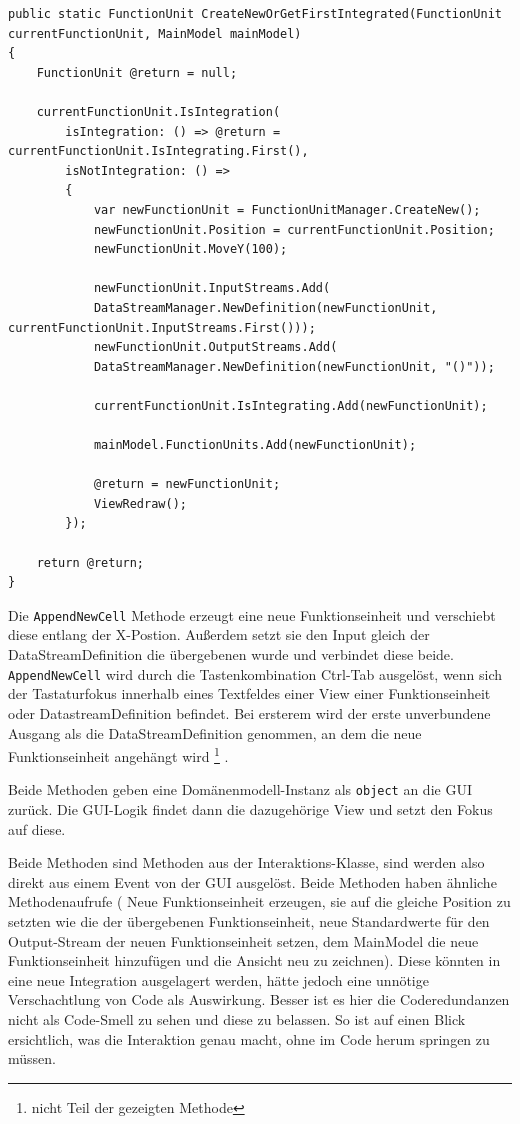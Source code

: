 \begin{lstlisting}[caption=CreateNewOrGetFirstIntegrated]
public static FunctionUnit CreateNewOrGetFirstIntegrated(FunctionUnit currentFunctionUnit, MainModel mainModel)
{
	FunctionUnit @return = null;
	
	currentFunctionUnit.IsIntegration(
		isIntegration: () => @return = 		currentFunctionUnit.IsIntegrating.First(),
		isNotIntegration: () =>
		{
			var newFunctionUnit = FunctionUnitManager.CreateNew();
			newFunctionUnit.Position = currentFunctionUnit.Position;
			newFunctionUnit.MoveY(100);
			
			newFunctionUnit.InputStreams.Add(
			DataStreamManager.NewDefinition(newFunctionUnit, currentFunctionUnit.InputStreams.First()));
			newFunctionUnit.OutputStreams.Add(
			DataStreamManager.NewDefinition(newFunctionUnit, "()"));
			
			currentFunctionUnit.IsIntegrating.Add(newFunctionUnit);
			
			mainModel.FunctionUnits.Add(newFunctionUnit);
			
			@return = newFunctionUnit;
			ViewRedraw();
		});
	
	return @return;
}
	\end{lstlisting}





	Die \texttt{AppendNewCell} Methode erzeugt eine neue Funktionseinheit und 
	verschiebt diese entlang der X-Postion.
	Außerdem setzt sie den Input gleich der DataStreamDefinition die
	übergebenen wurde und verbindet diese beide.
	\texttt{AppendNewCell} wird durch die Tastenkombination Ctrl-Tab ausgelöst, wenn
	sich der Tastaturfokus innerhalb eines Textfeldes einer View einer Funktionseinheit oder
	DatastreamDefinition befindet. Bei ersterem wird der erste unverbundene
  Ausgang als die	DataStreamDefinition genommen, an dem die neue Funktionseinheit angehängt wird \footnote{nicht Teil der gezeigten Methode} .
	
	Beide Methoden geben eine
	Domänenmodell-Instanz als \texttt{object} an die GUI zurück. Die GUI-Logik findet dann die
	dazugehörige View und setzt den Fokus auf diese.
	
	Beide Methoden sind Methoden aus der Interaktions-Klasse, sind werden also
	direkt aus einem Event von der GUI ausgelöst. 
	Beide Methoden haben ähnliche Methodenaufrufe ( Neue Funktionseinheit
	erzeugen, sie auf die gleiche Position zu setzten wie die der übergebenen
	Funktionseinheit, neue Standardwerte für den Output-Stream der neuen
	Funktionseinheit setzen, dem MainModel die neue Funktionseinheit hinzufügen
  und die Ansicht neu zu zeichnen).
  Diese könnten in eine neue Integration ausgelagert werden, hätte jedoch eine unnötige
	Verschachtlung von Code als Auswirkung. Besser ist es hier die
	Coderedundanzen nicht als Code-Smell zu sehen und diese zu belassen.
	So ist auf einen Blick ersichtlich, was die Interaktion genau macht, ohne
	im Code herum springen zu müssen.

